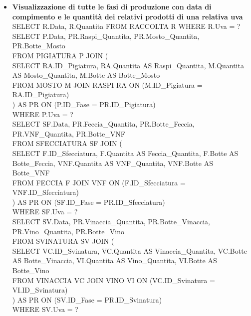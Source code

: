 \documentclass{article}
\begin{document}
\begin{itemize}
\item \textbf{Visualizzazione di tutte le fasi di produzione con data di compimento e le quantità dei relativi prodotti di una relativa uva}\\\newline
SELECT R.Data, R.Quantita FROM RACCOLTA R  WHERE R.Uva = ?  \\\newline
SELECT P.Data, PR.Raspi\_Quantita, PR.Mosto\_Quantita, PR.Botte\_Mosto\\
FROM PIGIATURA P JOIN (\\
SELECT RA.ID\_Pigiatura, RA.Quantita AS Raspi\_Quantita, M.Quantita AS Mosto\_Quantita, M.Botte AS Botte\_Mosto\\
FROM MOSTO M JOIN RASPI RA ON (M.ID\_Pigiatura = RA.ID\_Pigiatura)\\
) AS PR  ON (P.ID\_Fase = PR.ID\_Pigiatura)\\
WHERE P.Uva = ?\\\newline
SELECT SF.Data,  PR.Feccia\_Quantita,  PR.Botte\_Feccia, PR.VNF\_Quantita, PR.Botte\_VNF\\
FROM SFECCIATURA SF JOIN (\\
SELECT F.ID\_Sfecciatura, F.Quantita AS Feccia\_Quantita,  F.Botte AS Botte\_Feccia, VNF.Quantita AS VNF\_Quantita, VNF.Botte AS Botte\_VNF\\
FROM FECCIA F JOIN VNF ON (F.ID\_Sfecciatura = VNF.ID\_Sfecciatura)\\
) AS PR  ON (SF.ID\_Fase = PR.ID\_Sfecciatura)\\
WHERE SF.Uva = ?\\\newline
SELECT SV.Data,  PR.Vinaccia\_Quantita,  PR.Botte\_Vinaccia, PR.Vino\_Quantita, PR.Botte\_Vino\\
FROM SVINATURA SV JOIN (\\
SELECT VC.ID\_Svinatura, VC.Quantita AS Vinaccia\_Quantita,  VC.Botte AS Botte\_Vinaccia, VI.Quantita AS Vino\_Quantita, VI.Botte AS Botte\_Vino\\
FROM VINACCIA VC JOIN VINO VI ON (VC.ID\_Svinatura = VI.ID\_Svinatura)\\
) AS PR  ON (SV.ID\_Fase = PR.ID\_Svinatura)\\
WHERE SV.Uva = ?\\\newline


\end{itemize}
\end{document}
